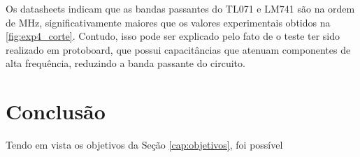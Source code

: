 \documentclass[
	12pt,				%
	oneside,			%
	a4paper,			%
	chapter=TITLE,
	sumario=tradicional,
	english,			%
	brazil				%
]{abntex2}
\begin{document}
Os datasheets indicam que as bandas passantes do TL071 e LM741 são na ordem de MHz, 
significativamente maiores que os valores experimentais obtidos na \autoref{fig:exp4_corte}.
Contudo, isso pode ser explicado pelo fato de o teste ter sido realizado em protoboard, 
que possui capacitâncias que atenuam componentes de alta frequência, reduzindo a 
banda passante do circuito.

\chapter{Conclusão}\label{cap:conclusao} 

Tendo em vista os objetivos da Seção \ref{cap:objetivos}, foi possível 
\end{document}
